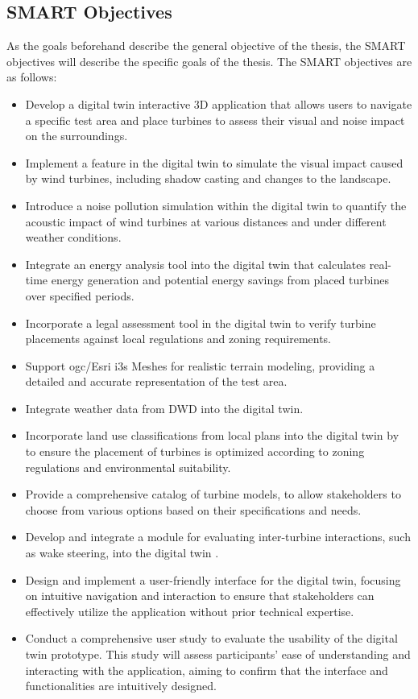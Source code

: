 \documentclass[11pt, titlepage, a4paper]{scrartcl}
\begin{document}
\begin{linenumbers}
    \subsection{SMART Objectives}
    As the goals beforehand describe the general objective of the thesis, the SMART objectives will describe the specific goals of the thesis. The SMART objectives are as follows:
    \begin{itemize}[label={--}]
        \item Develop a digital twin interactive 3D application  that allows users to navigate a specific test area and place turbines to assess their visual and noise impact on the surroundings.
        \item Implement a feature  in the digital twin to simulate the visual impact caused by wind turbines, including shadow casting and changes to the landscape.
        \item Introduce a noise pollution simulation within the digital twin to quantify the acoustic impact of wind turbines at various distances and under different weather conditions.
        \item Integrate an energy analysis tool into the digital twin  that calculates real-time energy generation and potential energy savings from placed turbines over specified periods.
        \item Incorporate a legal assessment tool  in the digital twin to verify turbine placements against local regulations and zoning requirements.
        \item Support \gls{ogc}/Esri \gls{i3s} Meshes for realistic terrain modeling, providing a detailed and accurate representation of the test area.
        \item Integrate weather data from DWD into the digital twin.
        \item Incorporate land use classifications from local plans into the digital twin by to ensure the placement of turbines is optimized according to zoning regulations and environmental suitability.
        \item Provide a comprehensive catalog of turbine models, to allow stakeholders to choose from various options based on their specifications and needs.
        \item Develop and integrate a module for evaluating inter-turbine interactions, such as wake steering, into the digital twin \cite{howlandWindFarmPower2019a}.
        \item  Design and implement a user-friendly interface for the digital twin, focusing on intuitive navigation and interaction to ensure that stakeholders can effectively utilize the application without prior technical expertise.
        \item Conduct a comprehensive user study to evaluate the usability of the digital twin prototype. This study will assess participants' ease of understanding and interacting with the application, aiming to confirm that the interface and functionalities are intuitively designed.
    \end{itemize}



\end{linenumbers}
\end{document}

